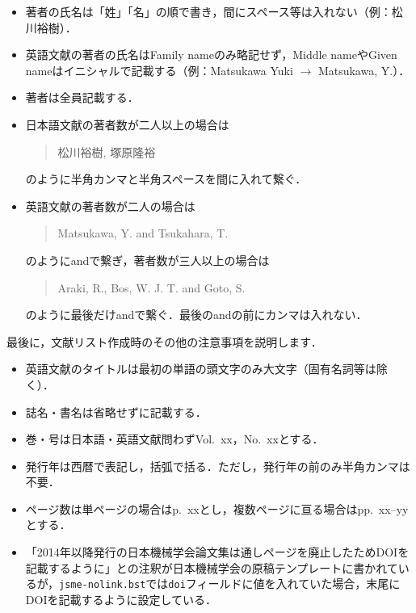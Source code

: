 \documentclass[a4paper,fleqn,uplatex,dvipdfmx]{jsarticle}
\newcommand{\jsmefile}{\texttt{jsme-nolink.bst}}
\begin{document}
\begin{itembox}[l]{}
    \begin{itemize}
        \item 著者の氏名は「姓」「名」の順で書き，間にスペース等は入れない（例：松川裕樹）．
        \item 英語文献の著者の氏名はFamily nameのみ略記せず，Middle nameやGiven nameはイニシャルで記載する（例：Matsukawa Yuki $\to$ Matsukawa, Y.）．
        \item 著者は全員記載する．
        \item 日本語文献の著者数が二人以上の場合は
            \begin{quote}
                松川裕樹, 塚原隆裕        
            \end{quote}
            のように半角カンマと半角スペースを間に入れて繋ぐ．
        \item 英語文献の著者数が二人の場合は
            \begin{quote}
                Matsukawa, Y. and Tsukahara, T.        
            \end{quote}
            のようにandで繋ぎ，著者数が三人以上の場合は
            \begin{quote}
                Araki, R., Bos, W. J. T. and Goto, S.            
            \end{quote}
            のように最後だけandで繋ぐ．最後のandの前にカンマは入れない．
    \end{itemize}
\end{itembox}
最後に，文献リスト作成時のその他の注意事項を説明します．
\begin{itembox}[l]{}
    \begin{itemize}
        \item 英語文献のタイトルは最初の単語の頭文字のみ大文字（固有名詞等は除く）．
        \item 誌名・書名は省略せずに記載する．
        \item 巻・号は日本語・英語文献問わずVol.~xx，No.~xxとする．
        \item 発行年は西暦で表記し，括弧で括る．ただし，発行年の前のみ半角カンマは不要．
        \item ページ数は単ページの場合はp.~xxとし，複数ページに亘る場合はpp.~xx--yyとする．
        \item 「2014年以降発行の日本機械学会論文集は通しページを廃止したためDOIを記載するように」との注釈が日本機械学会の原稿テンプレートに書かれているが，\jsmefile では\verb|doi|フィールドに値を入れていた場合，末尾にDOIを記載するように設定している．
    \end{itemize}
\end{itembox}
\end{document}
